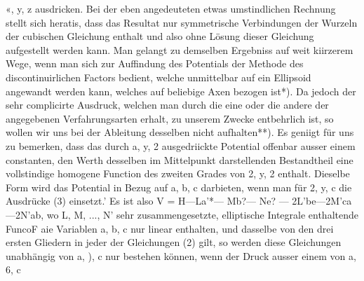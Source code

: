 \documentclass[11pt]{article}
\begin{document}
«, y, z ausdricken. Bei der eben angedeuteten etwas umstindlichen Rechnung stellt sich
heratis, dass das Resultat nur symmetrische Verbindungen der Wurzeln der cubischen
Gleichung enthalt und also ohne Lösung dieser Gleichung aufgestellt werden kann. Man
gelangt zu demselben Ergebniss auf weit kiirzerem Wege, wenn man sich zur Auﬃndung
des Potentials der Methode des discontinuirlichen Factors bedient, welche unmittelbar
auf ein Ellipsoid angewandt werden kann, welches auf beliebige Axen bezogen ist*). Da
jedoch der sehr complicirte Ausdruck, welchen man durch die eine oder die andere der
angegebenen Verfahrungsarten erhalt, zu unserem Zwecke entbehrlich ist, so wollen wir
uns bei der Ableitung desselben nicht aufhalten**). Es geniigt für uns zu bemerken, dass
das durch a, y, 2 ausgedriickte Potential offenbar ausser einem constanten, den Werth desselben im Mittelpunkt darstellenden Bestandtheil eine vollstindige homogene Function
des zweiten Grades von 2, y, 2 enthalt. Dieselbe Form wird das Potential in Bezug auf a,
b, c darbieten, wenn man für 2, y, c die Ausdrücke (3) einsetzt.’ Es ist also V = H—La’*—
Mb?— Ne? — 2L’be—2M’ca—2N’ab, wo L, M, ..., N’ sehr zusammengesetzte, elliptische
Integrale enthaltende FuncoF aie Variablen a, b, c nur linear enthalten, und dasselbe von
den drei ersten Gliedern in jeder der Gleichungen (2) gilt, so werden diese Gleichungen
unabhängig von a, ), c nur bestehen können, wenn der Druck ausser einem von a, 6, c
\end{document}
